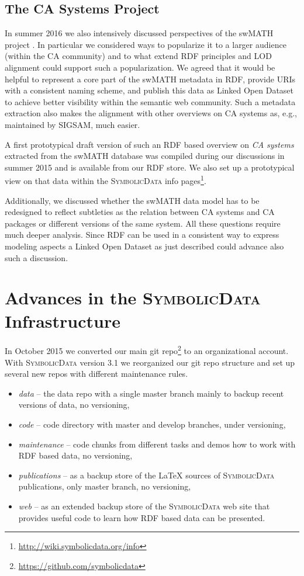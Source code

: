 \documentclass[a4paper,11pt]{article}
\def\SD{\textsc{SymbolicData}}
\begin{document}
\subsection{The CA Systems Project}

In summer 2016 we also intensively discussed perspectives of the swMATH project
\cite{swmath}. In particular we considered ways to popularize it to a larger
audience (within the CA community) and to what extend RDF principles and LOD
alignment could support such a popularization.  We agreed that it would be
helpful to represent a core part of the swMATH metadata in RDF, provide URIs
with a consistent naming scheme, and publish this data as Linked Open Dataset
to achieve better visibility within the semantic web community.  Such a
metadata extraction also makes the alignment with other overviews on CA systems
as, e.g., maintained by SIGSAM, much easier.

A first prototypical draft version of such an RDF based overview on \emph{CA
  systems} extracted from the swMATH database was compiled during our
discussions in summer 2015 and is available from our RDF store.  We also set up
a prototypical view on that data within the {\SD} info pages\footnote{
  \url{http://wiki.symbolicdata.org/info}}.

Additionally, we discussed whether the swMATH data model has to be redesigned
to reflect subtleties as the relation between CA systems and CA packages or
different versions of the same system.  All these questions require much deeper
analysis.  Since RDF can be used in a consistent way to express modeling
aspects a Linked Open Dataset as just described could advance also such a
discussion.

\section{Advances in the {\SD} Infrastructure}

In October 2015 we converted our main git repo\footnote{
  \url{https://github.com/symbolicdata}} to an organizational account. With
{\SD} version 3.1 we reorganized our git repo structure and set up several new
repos with different maintenance rules.
\begin{itemize}
\item \emph{data} -- the data repo with a single master branch mainly to backup
  recent versions of data, no versioning,
\item \emph{code} -- code directory with master and develop branches, under
  versioning,
\item \emph{maintenance} -- code chunks from different tasks and demos how to
  work with RDF based data, no versioning,
\item \emph{publications} -- as a backup store of the {\LaTeX} sources of {\SD}
  publications, only master branch, no versioning,
\item \emph{web} -- as an extended backup store of the {\SD} web site that
  provides useful code to learn how RDF based data can be presented.
\end{itemize}
\end{document}
